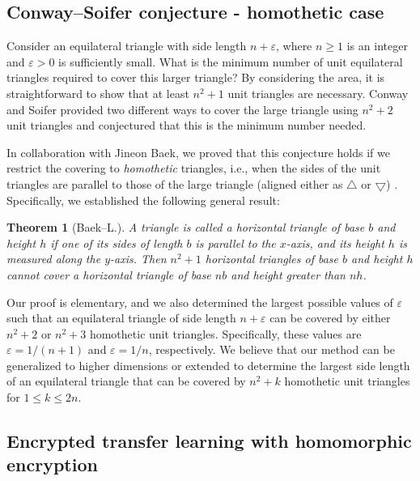 \documentclass[12pt]{article}
\newtheorem*{theorem*}{Theorem}
\begin{document}
\subsection*{Conway--Soifer conjecture - homothetic case}

Consider an equilateral triangle with side length $n + \varepsilon$, where $n \ge 1$ is an integer and $\varepsilon > 0$ is sufficiently small.
What is the minimum number of unit equilateral triangles required to cover this larger triangle?
By considering the area, it is straightforward to show that at least $n^2 + 1$ unit triangles are necessary.
Conway and Soifer provided two different ways to cover the large triangle using $n^2 + 2$ unit triangles \cite{conway2005covering} and conjectured that this is the minimum number needed.

In collaboration with Jineon Baek, we proved that this conjecture holds if we restrict the covering to \emph{homothetic} triangles, i.e., when the sides of the unit triangles are parallel to those of the large triangle (aligned either as $\bigtriangleup$ or $\bigtriangledown$) \cite{baek2024n2}.
Specifically, we established the following general result:

\begin{theorem*}[Baek--L.] A triangle is called a horizontal triangle of base $b$ and height $h$ if one of its sides of length $b$ is parallel to the $x$-axis, and its height $h$ is measured along the $y$-axis. Then $n^2 + 1$ horizontal triangles of base $b$ and height $h$ cannot cover a horizontal triangle of base $nb$ and height greater than $nh$. \end{theorem*}

Our proof is elementary, and we also determined the largest possible values of $\varepsilon$ such that an equilateral triangle of side length $n + \varepsilon$ can be covered by either $n^2 + 2$ or $n^2 + 3$  homothetic unit triangles.
Specifically, these values are $\varepsilon= 1 / (n + 1)$ and $\varepsilon = 1 / n$, respectively.
We believe that our method can be generalized to higher dimensions or extended to determine the largest side length of an equilateral triangle that can be covered by $n^2 + k$ homothetic unit triangles for $1 \le k \le 2n$.


\subsection*{Encrypted transfer learning with homomorphic encryption}
\end{document}
